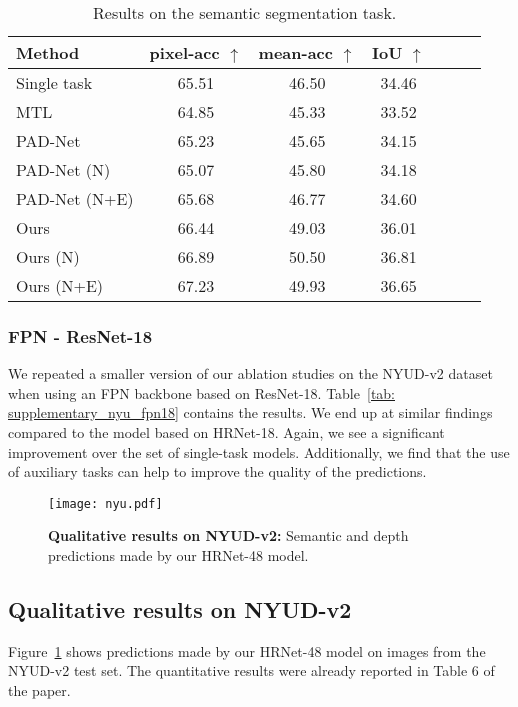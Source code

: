 \documentclass[runningheads]{llncs}
\begin{document}
\begin{table}[t]
\bigskip
   
\begin{subtable}{1.0\linewidth} 
\centering
\caption{Results on the semantic segmentation task.}
\label{tab: nyu_sem_fpn18}
\footnotesize{
\begin{tabular}{|l|c|c|c|c|c|c|}
\hline
Method & pixel-acc $\uparrow$ & mean-acc $\uparrow$ & IoU $\uparrow$ \\
\hline
Single task & 65.51 & 46.50 & 34.46 \\
MTL & 64.85 & 45.33 & 33.52 \\
\hline
PAD-Net & 65.23 & 45.65 & 34.15 \\
PAD-Net (N) & 65.07 & 45.80 & 34.18 \\
PAD-Net (N+E) & 65.68 & 46.77 & 34.60 \\
\hline
Ours & 66.44 & 49.03 & 36.01 \\
Ours (N) & 66.89 & 50.50 & 36.81 \\
Ours (N+E) & 67.23 & 49.93 & 36.65 \\
\hline
\end{tabular}}
\end{subtable}\end{table}

\subsubsection{FPN - ResNet-18}
\label{subsec: supl_nyud_fpn18}
We repeated a smaller version of our ablation studies on the NYUD-v2 dataset when using an FPN backbone based on ResNet-18. Table~\ref{tab: supplementary_nyu_fpn18} contains the results. We end up at similar findings compared to the model based on HRNet-18. Again, we see a significant improvement over the set of single-task models. Additionally, we find that the use of auxiliary tasks can help to improve the quality of the predictions.

\begin{figure}[t]
\centering
\texttt{[image: nyu.pdf]}
\caption{\textbf{Qualitative results on NYUD-v2:} Semantic and depth predictions made by our HRNet-48 model.}
\label{fig: nyu_qualitative}
\end{figure}

\subsection{Qualitative results on NYUD-v2}
Figure~\ref{fig: nyu_qualitative} shows predictions made by our HRNet-48 model on images from the NYUD-v2 test set. The quantitative results were already reported in Table 6 of the paper.

\clearpage


\end{document}
